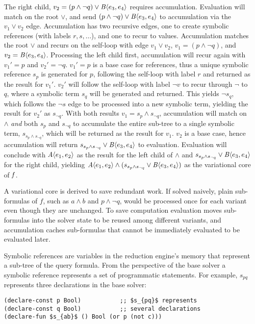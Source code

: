 The right child, $v_2=(p\wedge \neg q) \vee \chc[B]{e_3, e_4}$ requires
accumulation. Evaluation will match on the root $\vee$, and send $(p\wedge \neg
q) \vee \chc[B]{e_3, e_4}$ to accumulation via the $v_{1} \vee v_{2}$ edge.
Accumulation has two recursive edges, one to create symbolic references (with
labels $r, s, \hdots$), and one to recur to values. Accumulation matches the
root $\vee$ and recurs on the self-loop with edge $v_{1} \vee v_{2}$, $v_{1} =
(p\wedge \neg q)$, and $v_{2} = \chc[B]{e_3, e_4}$. Processing the left child
first, accumulation will recur again with $v_{1}' = p$ and $v_{2}' = \neg q$.
$v_{1}' = p$ is a base case for references, thus a unique symbolic reference
$s_{p}$ is generated for $p$, following the self-loop with label $r$ and
returned as the result for $v_{1}'$. $v_{2}'$ will follow the self-loop with
label $\neg v$ to recur through $\neg$ to $q$, where a symbolic term $s_{q}$
will be generated and returned. This yields $\neg s_{q}$, which follows the
$\neg s$ edge to be processed into a new symbolic term, yielding the result for
$v_{2}'$ as $s_{\neg q}$. With both results $v_{1} = s_{p}\wedge s_{\neg q}$,
accumulation will match on $\wedge$ \emph{and} both $s_{p}$ and $s_{\neg q}$ to
accumulate the entire sub-tree to a single symbolic term, $s_{s_{p} \wedge
  s_{\neg q}}$, which will be returned as the result for $v_{1}$. $v_{2}$ is a
base case, hence accumulation will return $s_{s_{p} \wedge s_{\neg q}} \vee
\chc[B]{e_3, e_4}$ to evaluation. Evaluation will conclude with
$\chc[A]{e_1,e_2}$ as the result for the left child of $\wedge$ and $s_{s_{p}
  \wedge s_{\neg q}} \vee \chc[B]{e_3, e_4}$ for the right child, yielding
$\chc[A]{e_1,e_2} \wedge (s_{s_{p} \wedge s_{\neg q}} \vee \chc[B]{e_3, e_4})$ as
the variational core of $\mathit{f}$.

A variational core is derived to save redundant work. If solved naively, plain
sub-formulas of $f$, such as $a \wedge b$ and $p \wedge \neg q$, would be
processed once for each variant even though they are unchanged. To save
computation evaluation moves sub-formulas into the solver state to be reused
among different variants, and accumulation caches sub-formulas that cannot be
immediately evaluated to be evaluated later.

Symbolic references are variables in the reduction engine's memory that
represent a sub-tree of the query formula. From the perspective of the base
solver a symbolic reference represents a set of programmatic statements. For
example, $s_{pq}$ represents three declarations in the base solver:
%
\begin{lstlisting}[columns=flexible,keepspaces=true]
(declare-const p Bool)           ;; $s_{pq}$ represents
(declare-const q Bool)           ;; several declarations
(declare-fun $s_{ab}$ () Bool (or p (not c)))
\end{lstlisting}

